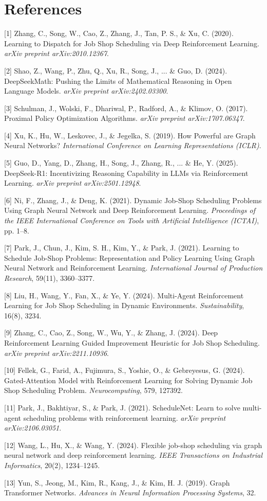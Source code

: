 \documentclass{article}
\begin{document}
\section*{References}

\small

[1] Zhang, C., Song, W., Cao, Z., Zhang, J., Tan, P. S., \& Xu, C. (2020). Learning to Dispatch for Job Shop Scheduling via Deep Reinforcement Learning. \textit{arXiv preprint arXiv:2010.12367}.

[2] Shao, Z., Wang, P., Zhu, Q., Xu, R., Song, J., ... \& Guo, D. (2024). DeepSeekMath: Pushing the Limits of Mathematical Reasoning in Open Language Models. \textit{arXiv preprint arXiv:2402.03300}.

[3] Schulman, J., Wolski, F., Dhariwal, P., Radford, A., \& Klimov, O. (2017). Proximal Policy Optimization Algorithms. \textit{arXiv preprint arXiv:1707.06347}.

[4] Xu, K., Hu, W., Leskovec, J., \& Jegelka, S. (2019). How Powerful are Graph Neural Networks? \textit{International Conference on Learning Representations (ICLR)}.

[5] Guo, D., Yang, D., Zhang, H., Song, J., Zhang, R., ... \& He, Y. (2025). DeepSeek-R1: Incentivizing Reasoning Capability in LLMs via Reinforcement Learning. \textit{arXiv preprint arXiv:2501.12948}.

[6] Ni, F., Zhang, J., \& Deng, K. (2021). Dynamic Job-Shop Scheduling Problems Using Graph Neural Network and Deep Reinforcement Learning. \textit{Proceedings of the IEEE International Conference on Tools with Artificial Intelligence (ICTAI)}, pp. 1--8.

[7] Park, J., Chun, J., Kim, S. H., Kim, Y., \& Park, J. (2021). Learning to Schedule Job-Shop Problems: Representation and Policy Learning Using Graph Neural Network and Reinforcement Learning. \textit{International Journal of Production Research}, 59(11), 3360--3377.

[8] Liu, H., Wang, Y., Fan, X., \& Ye, Y. (2024). Multi-Agent Reinforcement Learning for Job Shop Scheduling in Dynamic Environments. \textit{Sustainability}, 16(8), 3234.

[9] Zhang, C., Cao, Z., Song, W., Wu, Y., \& Zhang, J. (2024). Deep Reinforcement Learning Guided Improvement Heuristic for Job Shop Scheduling. \textit{arXiv preprint arXiv:2211.10936}.

[10] Fellek, G., Farid, A., Fujimura, S., Yoshie, O., \& Gebreyesus, G. (2024). Gated-Attention Model with Reinforcement Learning for Solving Dynamic Job Shop Scheduling Problem. \textit{Neurocomputing}, 579, 127392.

[11] Park, J., Bakhtiyar, S., \& Park, J. (2021). ScheduleNet: Learn to solve multi-agent scheduling problems with reinforcement learning. \textit{arXiv preprint arXiv:2106.03051}.

[12] Wang, L., Hu, X., \& Wang, Y. (2024). Flexible job-shop scheduling via graph neural network and deep reinforcement learning. \textit{IEEE Transactions on Industrial Informatics}, 20(2), 1234--1245.

[13] Yun, S., Jeong, M., Kim, R., Kang, J., \& Kim, H. J. (2019). Graph Transformer Networks. \textit{Advances in Neural Information Processing Systems}, 32.
\end{document}
